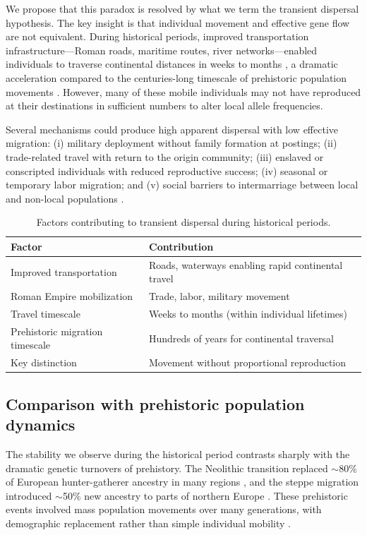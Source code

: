 \documentclass[11pt]{article}
\begin{document}
We propose that this paradox is resolved by what we term the transient dispersal hypothesis. The key insight is that individual movement and effective gene flow are not equivalent. During historical periods, improved transportation infrastructure---Roman roads, maritime routes, river networks---enabled individuals to traverse continental distances in weeks to months \citep{Scheidel2014}, a dramatic acceleration compared to the centuries-long timescale of prehistoric population movements \citep{Ammerman1971}. However, many of these mobile individuals may not have reproduced at their destinations in sufficient numbers to alter local allele frequencies.

Several mechanisms could produce high apparent dispersal with low effective migration: (i) military deployment without family formation at postings; (ii) trade-related travel with return to the origin community; (iii) enslaved or conscripted individuals with reduced reproductive success; (iv) seasonal or temporary labor migration; and (v) social barriers to intermarriage between local and non-local populations \citep{Killgrove2010,Prowse2016}.

\begin{table}[ht]
\centering
\caption{Factors contributing to transient dispersal during historical periods.}
\label{tab:transient}
\begin{tabular}{ll}
\toprule
Factor & Contribution \\
\midrule
Improved transportation & Roads, waterways enabling rapid continental travel \\
Roman Empire mobilization & Trade, labor, military movement \\
Travel timescale & Weeks to months (within individual lifetimes) \\
Prehistoric migration timescale & Hundreds of years for continental traversal \\
Key distinction & Movement without proportional reproduction \\
\bottomrule
\end{tabular}
\end{table}

\subsection{Comparison with prehistoric population dynamics}

The stability we observe during the historical period contrasts sharply with the dramatic genetic turnovers of prehistory. The Neolithic transition replaced $\sim$80\% of European hunter-gatherer ancestry in many regions \citep{Haak2015,Skoglund2016}, and the steppe migration introduced $\sim$50\% new ancestry to parts of northern Europe \citep{Allentoft2015}. These prehistoric events involved mass population movements over many generations, with demographic replacement rather than simple individual mobility \citep{Kristiansen2017}.
\end{document}
